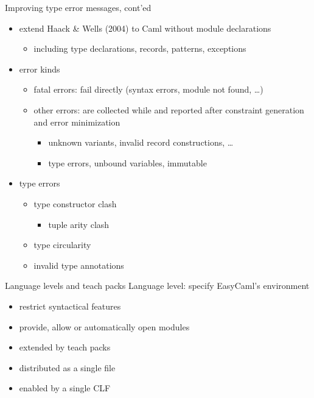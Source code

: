 \documentclass{beamer}
\newcommand\singleitem[1]{\begin{itemize}\item #1\end{itemize}}
\begin{document}
\begin{frame} {Improving type error messages, cont'ed}
  \begin{itemize}
    \item extend Haack \& Wells (2004) to Caml without module declarations
      \singleitem{including type declarations, records, patterns, exceptions}
    \item error kinds
      \begin{itemize}
        \item fatal errors: fail directly (syntax errors, module not found, \ldots)
        \item other errors: are collected while and reported after constraint generation and error minimization
          \begin{itemize}
            \item unknown variants, invalid record constructions, \ldots
            \item type errors, unbound variables, immutable 
          \end{itemize}
      \end{itemize}
    \item type errors
      \begin{itemize}
        \item type constructor clash 
           \singleitem{tuple arity clash}
        \item type circularity
        \item invalid type annotations
      \end{itemize}
  \end{itemize}
\end{frame}


\begin{frame} {Language levels and teach packs}
  Language level: specify EasyCaml's environment
  \begin{itemize}
    \item restrict syntactical features
    \item provide, allow or automatically open modules
    \item extended by teach packs
    \item distributed as a single file
    \item enabled by a single CLF
  \end{itemize}
\end{frame}
\end{document}
